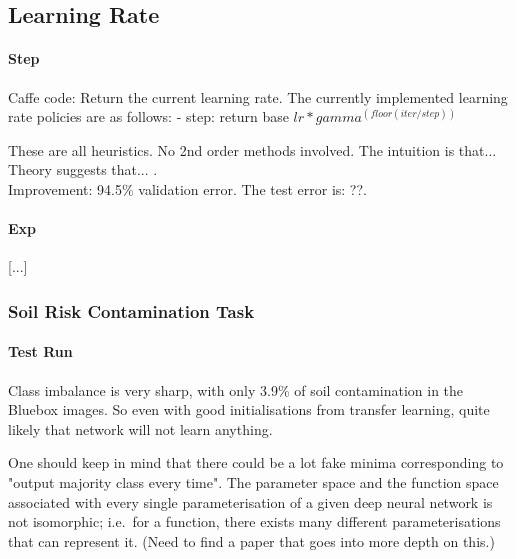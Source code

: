 \documentclass[a4paper,11pt]{article}
\begin{document}
\subsection{Learning Rate}

\paragraph{Step}

Caffe code:
 Return the current learning rate. The currently implemented learning rate
 policies are as follows:
    - step: return base $lr * gamma ^ (floor(iter / step))$
    

These are all heuristics. No 2nd order methods involved. The intuition is that... Theory suggests that... . \\

Improvement: 94.5\% validation error. The test error is: ??.\\

\paragraph{Exp}

[...] \\

\subsubsection{Soil Risk Contamination Task}

\paragraph{Test Run}

Class imbalance is very sharp, with only 3.9\% of soil contamination in the Bluebox images. So even with good initialisations from transfer learning, quite likely that network will not learn anything.

One should keep in mind that there could be a lot fake minima corresponding to "output majority class every time". The parameter space and the function space associated with every single parameterisation of a given deep neural network is not isomorphic; i.e.\ for a function, there exists many different parameterisations that can represent it. (Need to find a paper that goes into more depth on this.) \\
\end{document}
